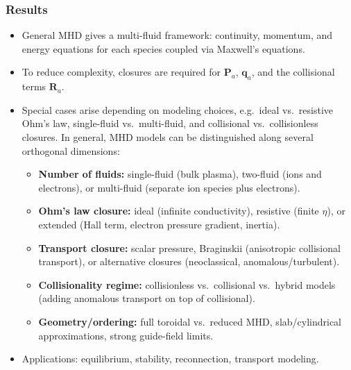 \documentclass[10pt]{book}
\begin{document}
\subsubsection{Results}
\begin{itemize}
    \item General MHD gives a multi-fluid framework: continuity, momentum, and energy equations for each species coupled via Maxwell’s equations.
    \item To reduce complexity, closures are required for $\mathbf{P}_a$, $\mathbf{q}_a$, and the collisional terms $\mathbf{R}_a$.
    \item Special cases arise depending on modeling choices, e.g.\ ideal vs.\ resistive Ohm's law, single-fluid vs.\ multi-fluid, and collisional vs.\ collisionless closures.
    In general, MHD models can be distinguished along several orthogonal dimensions:
    \begin{itemize}
        \item \textbf{Number of fluids:} single-fluid (bulk plasma), two-fluid (ions and electrons), or multi-fluid (separate ion species plus electrons).
        \item \textbf{Ohm's law closure:} ideal (infinite conductivity), resistive (finite $\eta$), or extended (Hall term, electron pressure gradient, inertia).
        \item \textbf{Transport closure:} scalar pressure, Braginskii (anisotropic collisional transport), or alternative closures (neoclassical, anomalous/turbulent).
        \item \textbf{Collisionality regime:} collisionless vs.\ collisional vs.\ hybrid models (adding anomalous transport on top of collisional).
        \item \textbf{Geometry/ordering:} full toroidal vs.\ reduced MHD, slab/cylindrical approximations, strong guide-field limits.
    \end{itemize}
    \item Applications: equilibrium, stability, reconnection, transport modeling.
\end{itemize}
\end{document}
